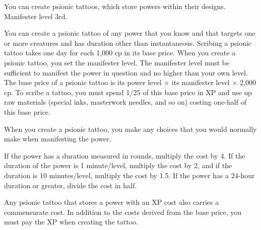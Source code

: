 {You can create psionic tattoos, which store powers within their designs.}
{Manifester level 3rd.}
{You can create a psionic tattoo of any power that you know and that targets one or more creatures and has duration other than instantaneous. Scribing a psionic tattoo takes one day for each 1,000 cp in its base price. When you create a psionic tattoo, you set the manifester level. The manifester level must be sufficient to manifest the power in question and no higher than your own level. The base price of a psionic tattoo is its power level $\times$ its manifester level $\times$ 2,000 cp. To scribe a tattoo, you must spend 1/25 of this base price in XP and use up raw materials (special inks, masterwork needles, and so on) costing one-half of this base price.

When you create a psionic tattoo, you make any choices that you would normally make when manifesting the power.

If the power has a duration measured in rounds, multiply the cost by 4. If the duration of the power is 1 minute/level, multiply the cost by 2, and if the duration is 10 minutes/level, multiply the cost by 1.5. If the power has a 24-hour duration or greater, divide the cost in half.

Any psionic tattoo that stores a power with an XP cost also carries a commensurate cost. In addition to the costs derived from the base price, you must pay the XP when creating the tattoo.}{}{}




